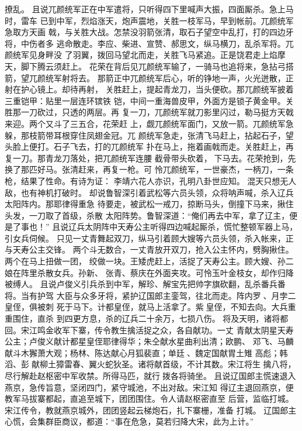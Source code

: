 撩乱。
且说兀颜统军正在中军遣将，只听得四下里喊声大振，四面厮杀。急上马时，雷车
已到中军，烈焰涨天，炮声震地，关胜一枝军马，早到帐前。兀颜统军急取方天画
戟，与关胜大战。怎禁没羽箭张清，取石子望空中乱打，打的四边牙将，中伤者多
逃命散走。李应、柴进、宣赞、郝思文，纵马横刀，乱杀军将。兀颜统军见身畔没
了羽翼，拨回马望北而走，关胜飞马紧追。正是饶君走上焰摩天，脚下腾云须赶上。
花荣在背后见兀颜统军输了，一骑马也追将来，急拈弓搭箭，望兀颜统军射将去。
那箭正中兀颜统军后心，听的铮地一声，火光迸散，正射在护心镜上。却待再射，
关胜赶上，提起青龙刀，当头便砍。那兀颜统军披着三重铠甲：贴里一层连环镔铁
铠，中间一重海兽皮甲，外面方是锁子黄金甲。关胜那一刀砍过，只透的两层。再
复一刀，兀颜统军就刀影里闪过，勒马挺方天戟来迎。两个又斗了三五合，花荣赶
上，觑兀颜统军面门，又放一箭。兀颜统军急躲，那枝箭带耳根穿住凤翅金冠。兀
颜统军急走，张清飞马赶上，拈起石子，望头脸上便打。石子飞去，打的兀颜统军
扑在马上，拖着画戟而走。关胜赶上，再复一刀。那青龙刀落处，把兀颜统军连腰
截骨带头砍着，下马去。花荣抢到，先换了那匹好马。张清赶来，再复一枪。可
怜兀颜统军，一世豪杰，一柄刀，一条枪，结果了性命。有诗为证：
李靖六花人亦识，孔明八卦世应知。
混天只想无人敌，也有神机打破时。
却说鲁智深引着武松等六员头领，众将呐声喊，杀入辽兵太阳阵内。那耶律得重急
待要走，被武松一戒刀，掠断马头，倒撞下马来，揪住头发，一刀取了首级，杀散
太阳阵势。鲁智深道：“俺们再去中军，拿了辽主，便是了事也！”
且说辽兵太阴阵中天寿公主听得四边喊起厮杀，慌忙整顿军器上马，引女兵伺候。
只见一丈青舞起双刀，纵马引着顾大嫂等六员头领，杀入帐来，正与天寿公主交锋。
两个斗无数合，一丈青放开双刀，抢入公主怀内，劈胸揪住。两个在马上扭做一团，
绞做一块。王矮虎赶上，活捉了天寿公主。顾大嫂、孙二娘在阵里杀散女兵。孙新、
张青、蔡庆在外面夹攻。可怜玉叶金枝女，却作归降被缚人。
且说卢俊义引兵杀到中军，解珍、解宝先把帅字旗砍翻，乱杀番兵番将。当有护驾
大臣与众多牙将，紧护辽国郎主銮驾，往北而走。阵内罗、月孛二皇侄，俱被刺
死于马下。计都皇侄，就马上活拿了。紫皇侄，不知去向。大兵重重围住，直杀
到四更方息，杀的辽兵二十余万，七损八伤。
将及天明，诸将都回。宋江鸣金收军下寨，传令教生擒活捉之众，各自献功。一丈
青献太阴星天寿公主；卢俊义献计都星皇侄耶律得华；朱仝献水星曲利出清；欧鹏、
邓飞、马麟献斗木獬萧大观；杨林、陈达献心月狐裴直；单廷、魏定国献胃土雉
高彪；韩滔、彭献柳土獐雷春、翼火蛇狄圣。诸将献首级，不计其数。宋江将生
擒八将，尽行解赴赵枢密中军收禁。所得马匹，就行拨各将骑坐。
且说辽国郎主慌速退入燕京，急传旨意，坚闭四门，紧守城池，不出对敌。宋江知
得辽主退回燕京，便教军马拔寨都起，直追至城下，团团围住。令人请赵枢密直至
后营，监临打城。宋江传令，教就燕京城外，团团竖起云梯炮石，扎下寨栅，准备
打城。
辽国郎主心慌，会集群臣商议，都道：“事在危急，莫若归降大宋，此为上计。”
